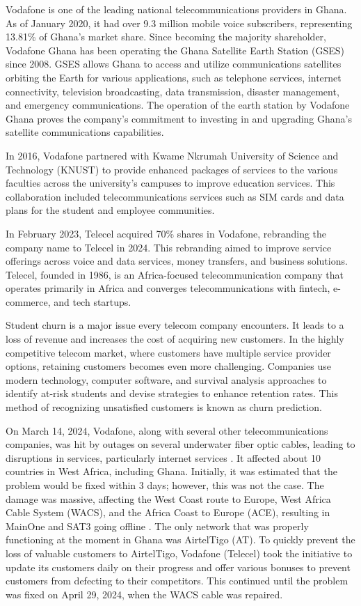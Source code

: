 \documentclass[12pt]{report}
\begin{document}
	Vodafone is one of the leading national telecommunications providers in Ghana. As of January 2020, it had over 9.3 million mobile voice subscribers, representing 13.81\% of Ghana's market share. Since becoming the majority shareholder, Vodafone Ghana has been operating the Ghana Satellite Earth Station (GSES) since 2008. GSES allows Ghana to access and utilize communications satellites orbiting the Earth for various applications, such as telephone services, internet connectivity, television broadcasting, data transmission, disaster management, and emergency communications. The operation of the earth station by Vodafone Ghana proves the company's commitment to investing in and upgrading Ghana's satellite communications capabilities.
	
	In 2016, Vodafone partnered with Kwame Nkrumah University of Science and Technology (KNUST) to provide enhanced packages of services to the various faculties across the university's campuses to improve education services. This collaboration included telecommunications services such as SIM cards and data plans for the student and employee communities.
	
	In February 2023, Telecel acquired 70\% shares in Vodafone, rebranding the company name to Telecel in 2024. This rebranding aimed to improve service offerings across voice and data services, money transfers, and business solutions. Telecel, founded in 1986, is an Africa-focused telecommunication company that operates primarily in Africa and converges telecommunications with fintech, e-commerce, and tech startups.
	
	Student churn is a major issue every telecom company encounters. It leads to a loss of revenue and increases the cost of acquiring new customers. In the highly competitive telecom market, where customers have multiple service provider options, retaining customers becomes even more challenging. Companies use modern technology, computer software, and survival analysis approaches to identify at-risk students and devise strategies to enhance retention rates. This method of recognizing unsatisfied customers is known as churn prediction.
	
	On March 14, 2024, Vodafone, along with several other telecommunications companies, was hit by outages on several underwater fiber optic cables, leading to disruptions in services, particularly internet services \cite{ghanaweb2023}. It affected about 10 countries in West Africa, including Ghana. Initially, it was estimated that the problem would be fixed within 3 days; however, this was not the case. The damage was massive, affecting the West Coast route to Europe, West Africa Cable System (WACS), and the Africa Coast to Europe (ACE), resulting in MainOne and SAT3 going offline \cite{apnews2023}. The only network that was properly functioning at the moment in Ghana was AirtelTigo (AT). To quickly prevent the loss of valuable customers to AirtelTigo, Vodafone (Telecel) took the initiative to update its customers daily on their progress and offer various bonuses to prevent customers from defecting to their competitors. This continued until the problem was fixed on April 29, 2024, when the WACS cable was repaired.
	
\end{document}
